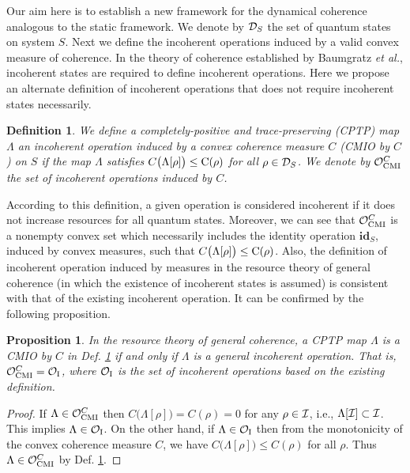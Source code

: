 \documentclass[american,aps,pra,reprint, superscriptaddress]{revtex4-1}
\theoremstyle{plain}
\newtheorem{defi}[thrm]{Definition}
\newtheorem{prop}[thrm]{Proposition}
\newcommand{\id}{\mathbf{id}}
\newcommand{\ids}[1]{\id_{#1}}
\def\mCMI{\textmd{CMI}} \def\mI{\textmd{I}} \def\mPI{\textmd{PI}}
\theoremstyle{definition}
\theoremstyle{remark}
\begin{document}
Our aim here is to establish a new framework for the dynamical coherence analogous to the static framework.
We denote by $\mathcal{D}_{S}$ the set of quantum states on system $S$.
Next we define the incoherent operations induced by a valid convex measure of coherence.
In the theory of coherence established by Baumgratz {\it et al.}, incoherent states are required to define incoherent operations. Here we propose an alternate definition of incoherent operations that does not require incoherent states necessarily.
%

\begin{defi}\label{df:1}
We define a completely-positive and trace-preserving (CPTP) map $\Lambda$ an incoherent operation induced by a convex coherence measure $C$ (CMIO by $C$) on $S$ if the map $\Lambda$ satisfies $C\big(\Lambda[\rho]\big)\leq \mathrm{C}(\rho)$ for all $\rho\in \mathcal{D}_S$. We denote by $\cO_{\mCMI}^{C}$ the set of incoherent operations induced by $C$.
\end{defi}

According to this definition, a given operation is considered incoherent if it does not increase resources for all quantum states.
Moreover, we can see that $\cO_{\mCMI}^{C}$ is a nonempty convex set which necessarily includes the identity operation $\ids{S}$, induced by convex measures, such that $C\big(\Lambda[\rho]\big)\leq \mathrm{C}(\rho)$.
%
Also, the definition of incoherent operation induced by measures in the resource theory of general coherence (in which the existence of incoherent states is assumed) is consistent with that of the existing incoherent operation. It can be confirmed by the following proposition.

\begin{prop}\label{pr:1}
In the resource theory of general coherence, a CPTP map $\Lambda$ is a CMIO by $C$ in Def. \ref{df:1} if and only if $\Lambda$ is a general incoherent operation. That is, $\cO_{\mCMI}^{C} = \cO_{\mI}$, where $\cO_{\mI}$ is the set of incoherent operations based on the existing definition.
\end{prop}
\begin{proof}
If $\Lambda\in\cO_{\mCMI}^{C}$ then $C\big(\Lambda[\rho]\big) = C(\rho) = 0$ for any $\rho\in \mathcal{I}$, i.e., $\Lambda[\mathcal{I}]\subset \mathcal{I}$. This implies $\Lambda\in\cO_{\mI}$. On the other hand, if $\Lambda\in\cO_{\mI}$ then from the monotonicity of the convex coherence measure $C$, we have $C\big(\Lambda[\rho]\big) \leq C(\rho)$ for all $\rho$. Thus $\Lambda\in\cO_{\mCMI}^{C}$ by Def. \ref{df:1}.
\end{proof}
\end{document}
